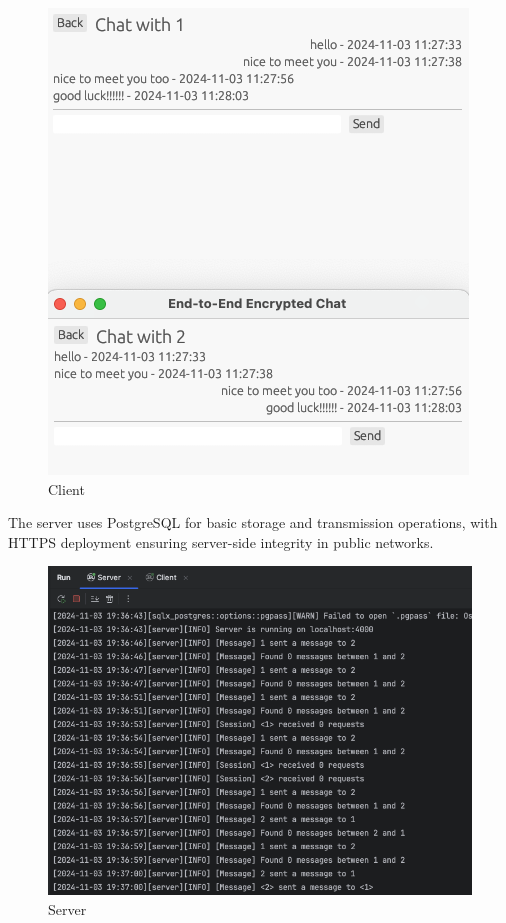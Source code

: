 \documentclass[9pt,a4paper,twoside]{rho-class/rho}
\begin{document}
\begin{figure}[H]
    \centering
    \includegraphics[width=1\linewidth]{figures/Screenshot 2024-11-03 at 22.30.24.png}
    \caption{Client}
    \label{fig:enter-label}
\end{figure}

The server uses PostgreSQL for basic storage and transmission operations, with HTTPS deployment ensuring server-side integrity in public networks.

\begin{figure}[H]
    \centering
    \includegraphics[width=1\linewidth]{figures/client.png}
    \caption{Server}
    \label{fig:enter-label}
\end{figure}
\end{document}
